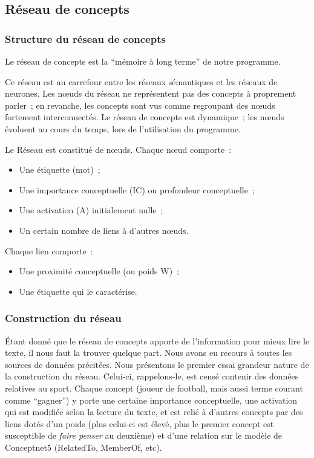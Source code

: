 \documentclass[a4paper, 12pt]{article}
\begin{document}
\subsection{Réseau de concepts}

\subsubsection{Structure du réseau de concepts}

\begin{definition}
Le réseau de concepts est la ``mémoire à long terme'' de notre programme.

Ce réseau est au carrefour entre les réseaux sémantiques et les réseaux de neurones. Les n\oe{}uds du réseau ne représentent pas des concepts à proprement parler~; en revanche, les concepts sont vus comme regroupant des n\oe{}uds fortement interconnectés. Le réseau de concepts est dynamique~; les nœuds évoluent au cours du temps, lors de l'utilisation du programme.
\end{definition}


Le Réseau est constitué de n\oe{}uds. Chaque n\oe{}ud comporte~:
\begin{itemize}
  \item Une étiquette (mot)~;
 \item Une importance conceptuelle (IC) ou profondeur conceptuelle~;
 \item Une activation (A) initialement nulle~;
 \item Un certain nombre de liens à d'autres n\oe{}uds.
\end{itemize}

Chaque lien comporte~:
\begin{itemize}
 \item Une proximité conceptuelle (ou poids W)~;
 \item Une étiquette qui le caractérise.
\end{itemize}


\subsubsection{Construction du réseau}

Étant donné que le réseau de concepts apporte de l'information pour mieux lire le texte, il nous faut la trouver quelque part. Nous avons eu recours à toutes les sources de données précitées. Nous présentons le premier essai grandeur nature de la construction du réseau. Celui-ci, rappelons-le, est censé contenir des données relatives au sport. Chaque concept (joueur de football, mais aussi terme courant comme ``gagner'') y porte une certaine importance conceptuelle, une activation qui est modifiée selon la lecture du texte, et est relié à d'autres concepts par des liens dotés d'un poids (plus celui-ci est élevé, plus le premier concept est susceptible de \textit{faire penser} au deuxième) et d'une relation sur le modèle de Conceptnet5 (RelatedTo, MemberOf, etc).
\end{document}
